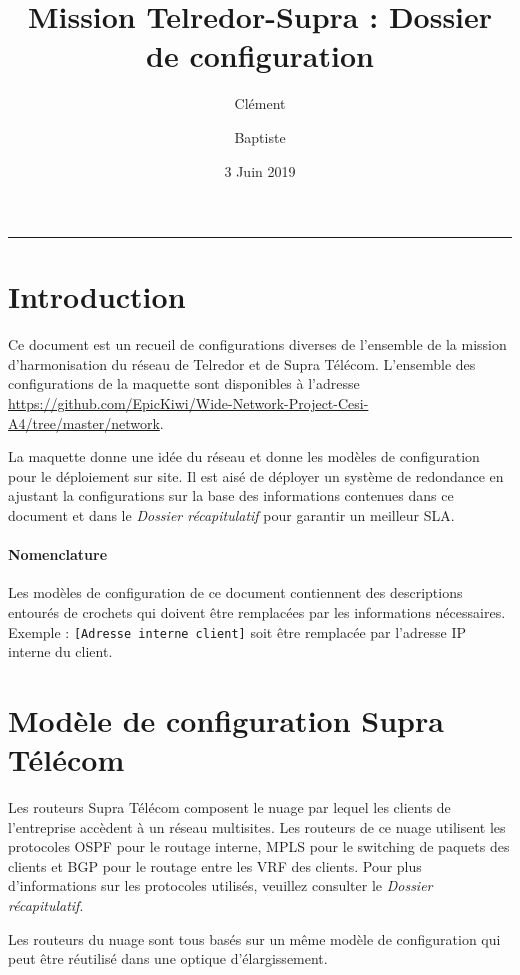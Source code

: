 \documentclass{article}
\title{Mission Telredor-Supra : Dossier de configuration}
\date{3 Juin 2019}
\author{Clément \bsc{Boutin} \and Baptiste \bsc{Saclier}}
\newcommand{\tlr}{Telredor\xspace}
\newcommand{\spr}{Supra Télécom\xspace}
\begin{document}
\maketitle

\begin{center}
\rule{0.5\textwidth}{0.4pt}
\end{center}

\tableofcontents

\section{Introduction}

Ce document est un recueil de configurations diverses de l'ensemble de la mission d'harmonisation du réseau de \tlr et de \spr.
L'ensemble des configurations de la maquette sont disponibles à l'adresse \url{https://github.com/EpicKiwi/Wide-Network-Project-Cesi-A4/tree/master/network}.

\medskip

La maquette donne une idée du réseau et donne les modèles de configuration pour le déploiement sur site.
Il est aisé de déployer un système de redondance en ajustant la configurations sur la base des informations contenues dans ce document et dans le \emph{Dossier récapitulatif} pour garantir un meilleur SLA.

\paragraph{Nomenclature} Les modèles de configuration de ce document contiennent des descriptions entourés de crochets qui doivent être remplacées par les informations nécessaires.
Exemple : \texttt{\color{PineGreen}[Adresse interne client]} soit être remplacée par l'adresse IP interne du client.

\section{Modèle de configuration \spr}

Les routeurs \spr composent le nuage par lequel les clients de l'entreprise accèdent à un réseau multisites.
Les routeurs de ce nuage utilisent les protocoles OSPF pour le routage interne, MPLS pour le switching de paquets des clients et BGP pour le routage entre les VRF des clients.
Pour plus d'informations sur les protocoles utilisés, veuillez consulter le \emph{Dossier récapitulatif}.

Les routeurs du nuage sont tous basés sur un même modèle de configuration qui peut être réutilisé dans une optique d'élargissement.
\end{document}
